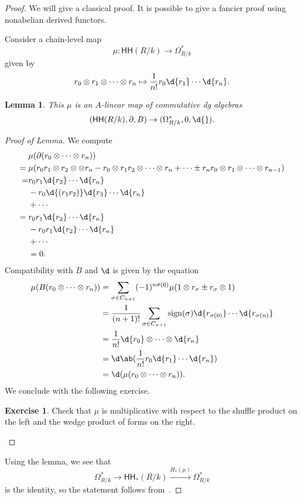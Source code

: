 \documentclass[10pt, oneside]{memoir}
\newtheorem{lem}[thm]{Lemma}
\theoremstyle{definition}
\newtheorem{exer}[thm]{Exercise}
\theoremstyle{remark}
\theoremstyle{plain}
\theoremstyle{definition}
\theoremstyle{remark}
\newcommand{\on}[1]{\operatorname{#1}}
\newcommand{\ms}[1]{\mathsf{#1}}
\newcommand{\1}{\mathbf{1}}
\newcommand{\2}{\mathbf{2}}
\newcommand{\3}{\mathbf{3}}
\newcommand{\HH}{\ms{HH}}
\begin{document}
\begin{proof}
    We will give a classical proof. It is possible to give a fancier proof using nonabelian derived functors.

    Consider a chain-level map
    \[ \mu \colon \HH(R/k) \to \Omega^*_{R/k} \]
    given by 
    \[ r_0 \otimes r_1 \otimes \cdots \otimes r_n \mapsto \frac{1}{n!} r_0 \d{r_1} \cdots \d{r_n}. \]
    \begin{lem}
        This \(\mu \) is an \(A \)-linear map of commutative dg algebras
        \[ (\HH(R/k), \partial, B) \to (\Omega^*_{R/k}, 0, \d{}). \]
    \end{lem}
    \begin{proof}[Proof of Lemma]
        We compute
        \begin{align*}
            &\mu(\partial(r_0 \otimes \cdots \otimes r_n)) \\
            ={}& \mu (r_0 r_1 \otimes r_2 \otimes \otimes r_n - r_0 \otimes r_1 r_2 \otimes \cdots \otimes r_n + \cdots \pm r_n r_0 \otimes r_1 \otimes \cdots \otimes r_{n-1}) \\
            =&{} r_0 r_1 \d{r_2} \cdots \d{r_n} \\
            &- r_0 \d{(r_1 r_2)} \d{r_3} \cdots \d{r_n} \\
            &+ \cdots \\
            ={}& r_0 r_1 \d{r_2} \cdots \d{r_n} \\
            &- r_0 r_1 \d{r_2} \cdots \d{r_n} \\
            &+ \cdots \\
            &= 0.
        \end{align*}
        Compatibility with \(B \) and \(\d \) is given by the equation
        \begin{align*}
            \mu(B(r_0\otimes \cdots \otimes r_n)) &= \sum_{\sigma \in C_{n+1}} (-1)^{n\sigma(0)} \mu(1 \otimes r_{\sigma} \pm r_{\sigma} \otimes 1) \\
            &= \frac{1}{(n+1)!} \sum_{\sigma \in C_{n+1}} \on{sign}(\sigma) \d{r_{\sigma(0)}} \cdots \d{r_{\sigma(n)}} \\
            &= \frac{1}{n!} \d{r_0} \otimes \cdots \otimes \d{r_n} \\
            &= \d \ab(\frac{1}{n!} r_0 \d{r_1} \cdots \d{r_n}) \\
            &= \d(\mu(r_0 \otimes \cdots \otimes r_n)).
        \end{align*}
        We conclude with the following exercise.
        \begin{exer}
            Check that \(\mu \) is multiplicative with respect to the shuffle product on the left and the wedge product of forms on the right. \qedhere
        \end{exer}
    \end{proof}
    Using the lemma, we see that
    \[ \Omega^*_{R/k} \to \HH_*(R/k) \xrightarrow{H_*(\mu)} \Omega^*_{R/k} \]
    is the identity, so the statement follows from~.
\end{proof}
\end{document}
